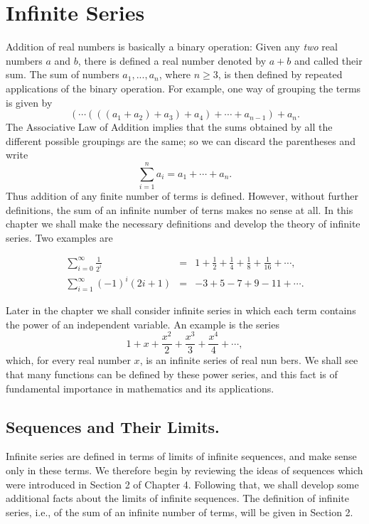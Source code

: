 \chapter{Infinite Series} \label{chp 9}
Addition of real numbers is basically a binary operation: Given any \textit{two} real numbers $a$ and $b$, there is defined a real number denoted by $a + b$ and called their sum. The sum of numbers $a_1, ..., a_n$, where  $n \geq 3$, is then defined by repeated applications of the binary operation. For example, one way of grouping the terms is given by
$$
( \cdots (((a_1 + a_2) + a_3) + a_4) + \cdots + a_{n-1}) + a_n .
$$
\noindent The Associative Law of Addition implies that the sums obtained by all the different possible groupings are the same; so we can discard the parentheses and write
$$
\sum_{i=1}^n a_i = a_1 + \cdots + a_n .
$$
\noindent Thus addition of any finite number of terms is defined. However, without further definitions, the sum of an infinite number of terns makes no sense at all. In this chapter we shall make the necessary definitions and develop the theory of infinite series. Two examples are

\begin{eqnarray*}
\sum_{i = 0}^\infty  \frac{1}{2^i} &=& 1 + \frac{1}{2} +  \frac{1}{4} +  \frac{1}{8} +  \frac{1}{16} + \cdots , \\
\sum_{i = 1}^\infty (-1)^i(2i + 1) &=& -3 + 5 - 7 + 9 - 11 + \cdots .
\end{eqnarray*}

\noindent Later in the chapter we shall consider infinite series in which each term contains the power of an independent variable. An example is the series
$$
1 + x + \frac{x^2}{2} + \frac{x^3}{3} + \frac{x^4}{4} + \cdots,
$$
\noindent which, for every real number $x$, is an infinite series of real nun bers. We shall see that many functions can be defined by these power series, and this fact is of fundamental importance in mathematics and its applications.

\section{Sequences and Their Limits.} Infinite series are defined in terms of limits of infinite sequences, and make sense only in these terms. We therefore begin by reviewing the ideas of sequences which were introduced in Section 2 of Chapter 4. Following that, we shall develop some additional facts about the limits of infinite sequences. The definition of infinite series, i.e., of the sum of an infinite number of terms, will be given in Section 2.

